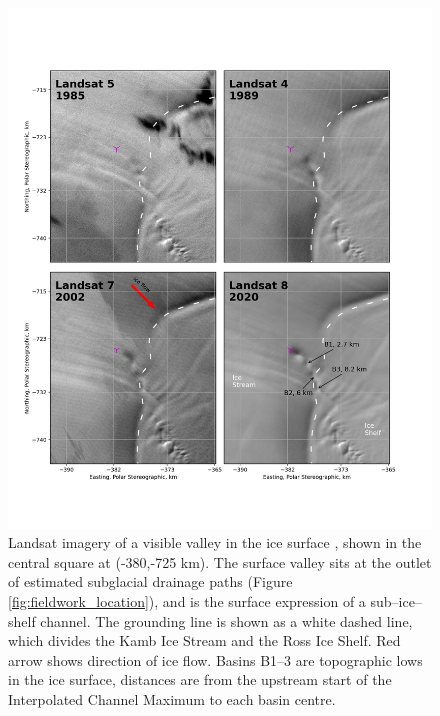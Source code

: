 \begin{figure}[!ht]
\centering
\includegraphics[width=1\textwidth]{chapters/2/historic_channel.png}
\caption[Historic Landsat imagery]{Landsat imagery of a visible valley in the ice surface \citep{RoyLandsat8Scienceproduct2014}, shown in the central square at (-380,-725 km). The surface valley sits at the outlet of estimated subglacial drainage paths (Figure \ref{fig:fieldwork_location}), and is the surface expression of a sub--ice--shelf channel. The grounding line \citep{depoorter2013calving} is shown as a white dashed line, which divides the Kamb Ice Stream and the Ross Ice Shelf. Red arrow shows direction of ice flow. Basins B1--3 are topographic lows in the ice surface, distances are  from the upstream start of the Interpolated Channel Maximum to each basin centre.}
\label{fig:historic}
\end{figure}





